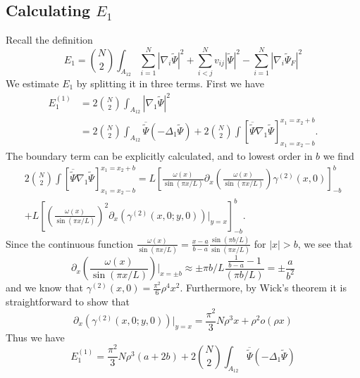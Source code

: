 \documentclass[a4paper,11pt]{article}
\newcommand{\abs}[1]{\left\lvert #1 \right\rvert}
\numberwithin{equation}{section}
\begin{document}
	\subsection{Calculating $ E_1 $}
	Recall the definition \begin{equation}
	E_1=\binom{N}{2}\int_{A_{12}} \sum_{i=1}^{N}\abs{\nabla_i\tilde{\Psi}}^2+\sum_{i<j}^{N}v_{ij}\abs{\tilde{\Psi}}^2-\sum_{i=1}^{N}\abs{\nabla_i\tilde{\Psi}_F}^2
	\end{equation}
	We estimate $ E_1 $ by splitting it in three terms. First we have \begin{equation}
	\begin{aligned}
	E_1^{(1)}&=2\binom{N}{2}\int_{A_{12}}\abs{\nabla_1\tilde{\Psi}}^2\\&
	=2\binom{N}{2}\int_{A_{12}}\overline{\tilde{\Psi}}\left( -\Delta_1 \tilde{\Psi} \right)+2\binom{N}{2}\int\left[\overline{\tilde{\Psi}}\nabla_1\tilde{\Psi}\right]_{x_1=x_2-b}^{x_1=x_2+b}.
	\end{aligned}
	\end{equation}
	The boundary term can be explicitly calculated, and to lowest order in $ b $ we find \begin{equation}
	\begin{aligned}
	2\binom{N}{2}\int\left[\overline{\tilde{\Psi}}\nabla_1\tilde{\Psi}\right]_{x_1=x_2-b}^{x_1=x_2+b}=L\left[\frac{\omega(x)}{\sin(\pi x/L)}\partial_x\left(\frac{\omega(x)}{\sin(\pi x/L)}\right)\gamma^{(2)}(x,0)\right]_{-b}^{b}\\+L\left[\left(\frac{\omega(x)}{\sin(\pi x/L)}\right)^2\partial_x\left(\gamma^{(2)}(x,0;y,0)\right)\bigg\vert_{y=x}\right]_{-b}^{b}.
	\end{aligned}
	\end{equation}
	Since the continuous function $ \frac{\omega(x)}{\sin(\pi x/L)}=\frac{x-a}{b-a}\frac{\sin(\pi b/L)}{\sin(\pi x/L)} $ for $ \abs{x}>b $, we see that \begin{equation}
	\partial_x\left(\frac{\omega(x)}{\sin(\pi x/L)}\right)\bigg\vert_{x=\pm b}\approx\pm\pi b/L\frac{\frac{1}{b-a}-1}{(\pi b/L)}=\pm\frac{a}{b^2}
	\end{equation}
	and we know that $ \gamma^{(2)}(x,0)=\frac{\pi^2}{6}\rho^4 x^2 $. Furthermore, by Wick's theorem it is straightforward to show that \begin{equation}\label{EqGammaDeriv.}
	\partial_x\left(\gamma^{(2)}(x,0;y,0)\right)\bigg\vert_{y=x}=\frac{\pi^2}{3}N\rho^3 x + \rho^2 o(\rho x)
	\end{equation}
	Thus we have \begin{equation}
	E_1^{(1)}=\frac{\pi^2}{3}N\rho^3 (a+2b)+2\binom{N}{2}\int_{A_{12}}\overline{\tilde{\Psi}}(-\Delta_1\tilde{\Psi})
	\end{equation}
\end{document}
